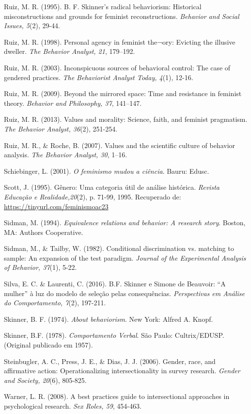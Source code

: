\hangindent=25pt
\noindent Ruiz, M. R. (1995). B. F. Skinner’s radical behaviorism: Historical misconstructions and grounds for feminist reconstructions. \textit{Behavior and Social Issues, 5}(2), 29-44. 

\hangindent=25pt
\noindent Ruiz, M. R. (1998). Personal agency in feminist the¬ory: Evicting the illusive dweller. \textit{The Behavior Analyst, 21}, 179–192.

\hangindent=25pt
\noindent Ruiz, M. R. (2003). Inconspicuous sources of behavioral control: The case of gendered practices. \textit{The Behaviorist Analyst Today, 4}(1), 12-16. 

\hangindent=25pt
\noindent Ruiz, M. R. (2009). Beyond the mirrored space: Time and resistance in feminist theory. \textit{Behavior and Philosophy, 37}, 141–147.

\hangindent=25pt
\noindent Ruiz, M. R. (2013). Values and morality: Science, faith, and feminist pragmatism. \textit{The Behavior Analyst, 36}(2), 251-254. 

\hangindent=25pt
\noindent Ruiz, M. R., \& Roche, B. (2007). Values and the scientific culture of behavior analysis. \textit{The Behavior Analyst, 30}, 1–16.

\hangindent=25pt
\noindent Schiebinger, L. (2001). \textit{O feminismo mudou a ciência}. Bauru: Edusc.

\hangindent=25pt
\noindent Scott, J. (1995). Gênero: Uma categoria útil de análise histórica. \textit{Revista Educação e Realidade,20}(2), p. 71-99, 1995. Recuperado de: \url{https://tinyurl.com/feminismoac23}

\hangindent=25pt
\noindent Sidman, M. (1994). \textit{Equivalence relations and behavior: A research story}. Boston, MA: Authors Cooperative.

\hangindent=25pt
\noindent Sidman, M., \& Tailby, W. (1982). Conditional discrimination vs. matching to sample: An expansion of the test paradigm. \textit{Journal of the Experimental Analysis of Behavior, 37}(1), 5-22.

\hangindent=25pt
\noindent Silva, E. C. \& Laurenti, C. (2016). B.F. Skinner e Simone de Beauvoir: ``A mulher'' à luz do modelo de seleção pelas consequências. \textit{Perspectivas em Análise do Comportamento, 7}(2), 197-211.

\hangindent=25pt
\noindent Skinner, B. F. (1974). \textit{About behaviorism}. New York: Alfred A. Knopf.

\hangindent=25pt
\noindent Skinner, B.F. (1978). \textit{Comportamento Verbal}. São Paulo: Cultrix/EDUSP. (Original publicado em 1957).

\hangindent=25pt
\noindent Steinbugler, A. C., Press, J. E., \& Dias, J. J. (2006). Gender, race, and affirmative action: Operationalizing intersectionality in survey research. \textit{Gender and Society, 20}(6), 805-825.

\hangindent=25pt
\noindent Warner, L. R. (2008). A best practices guide to intersectional approaches in psychological research. \textit{Sex Roles, 59}, 454-463.
